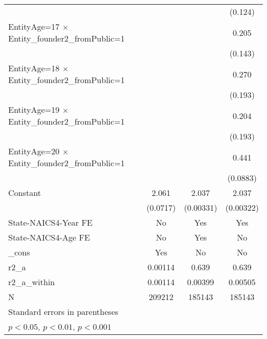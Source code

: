 {\begin{tabular}{l*{3}{c}}
                    &                     &                     &     (0.124)         \\
[1em]
EntityAge=17 $\times$ Entity\_founder2\_fromPublic=1&                     &                     &       0.205         \\
                    &                     &                     &     (0.143)         \\
[1em]
EntityAge=18 $\times$ Entity\_founder2\_fromPublic=1&                     &                     &       0.270         \\
                    &                     &                     &     (0.193)         \\
[1em]
EntityAge=19 $\times$ Entity\_founder2\_fromPublic=1&                     &                     &       0.204         \\
                    &                     &                     &     (0.193)         \\
[1em]
EntityAge=20 $\times$ Entity\_founder2\_fromPublic=1&                     &                     &       0.441\sym{***}\\
                    &                     &                     &    (0.0883)         \\
[1em]
Constant            &       2.061\sym{***}&       2.037\sym{***}&       2.037\sym{***}\\
                    &    (0.0717)         &   (0.00331)         &   (0.00322)         \\
[1em]
State-NAICS4-Year FE&          No         &         Yes         &         Yes         \\
[1em]
State-NAICS4-Age FE &          No         &         Yes         &          No         \\
[1em]
\_cons              &         Yes         &          No         &          No         \\
\hline
r2\_a                &     0.00114         &       0.639         &       0.639         \\
r2\_a\_within         &     0.00114         &     0.00399         &     0.00505         \\
N                   &      209212         &      185143         &      185143         \\
\hline\hline
\multicolumn{4}{l}{\footnotesize Standard errors in parentheses}\\
\multicolumn{4}{l}{\footnotesize \sym{*} \(p<0.05\), \sym{**} \(p<0.01\), \sym{***} \(p<0.001\)}\\
\end{tabular}
}
